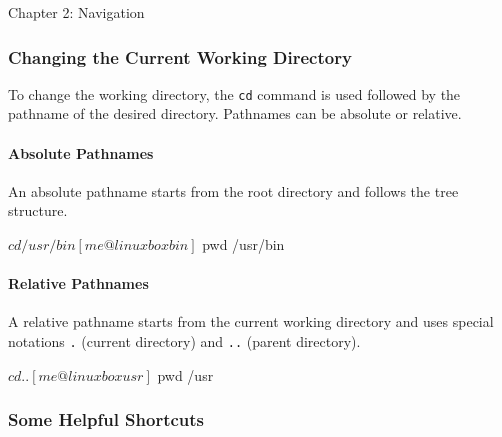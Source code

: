 \begin{notes}{Chapter 2: Navigation}
    \begin{highlight}
    \end{highlight}

    \subsubsection*{Changing the Current Working Directory}

    To change the working directory, the \texttt{cd} command is used followed by the pathname of the desired directory. Pathnames can be absolute or relative.

    \paragraph*{Absolute Pathnames}

    An absolute pathname starts from the root directory and follows the tree structure.

    \begin{highlight}
    \begin{code}[Pseudo]
    [me@linuxbox ~]$ cd /usr/bin
    [me@linuxbox bin]$ pwd
    /usr/bin
    \end{code}
    \end{highlight}

    \paragraph*{Relative Pathnames}

    A relative pathname starts from the current working directory and uses special notations \texttt{.} (current directory) and \texttt{..} (parent directory).

    \begin{highlight}
    \begin{code}$ cd ..
    [me@linuxbox usr]$ pwd
    /usr
    \end{code}
    \end{highlight}

    \subsubsection*{Some Helpful Shortcuts}


\end{notes}
